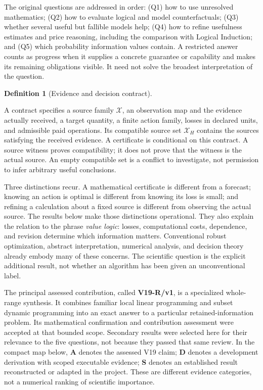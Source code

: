 \documentclass{article}
\theoremstyle{definition}
\newtheorem{definition}[theorem]{Definition}
\begin{document}
The original questions are addressed in order: (Q1) how to use
unresolved mathematics; (Q2) how to evaluate logical and model
counterfactuals; (Q3) whether several useful but fallible models help;
(Q4) how to refine usefulness estimates and price reasoning, including
the comparison with Logical Induction; and (Q5) which probability
information values contain. A restricted answer counts as progress when
it supplies a concrete guarantee or capability and makes its remaining
obligations visible. It need not solve the broadest interpretation of
the question.

\begin{definition}[Evidence and decision contract]\label{def-contract}

A contract specifies a source family \(\mathcal X\), an observation map
and the evidence actually received, a target quantity, a finite action
family, losses in declared units, and admissible paid operations. Its
compatible source set \(\mathcal X_H\) contains the sources satisfying
the received evidence. A certificate is conditional on this contract. A
source witness proves compatibility; it does not prove that the witness
is the actual source. An empty compatible set is a conflict to
investigate, not permission to infer arbitrary useful conclusions.

\end{definition}

Three distinctions recur. A mathematical certificate is different from a
forecast; knowing an action is optimal is different from knowing its
loss is small; and refining a calculation about a fixed source is
different from observing the actual source. The results below make those
distinctions operational. They also explain the relation to the phrase
\emph{value logic}: losses, computational costs, dependence, and
revision determine which information matters. Conventional robust
optimization, abstract interpretation, numerical analysis, and decision
theory already embody many of these concerns. The scientific question is
the explicit additional result, not whether an algorithm has been given
an unconventional label.

The principal assessed contribution, called \textbf{V19-R/v1}, is a
specialized whole-range synthesis. It combines familiar local linear
programming and subset dynamic programming into an exact answer to a
particular retained-information problem. Its mathematical confirmation
and contribution assessment were accepted at that bounded scope.
Secondary results were selected here for their relevance to the five
questions, not because they passed that same review. In the compact map
below, \textbf{A} denotes the assessed V19 claim; \textbf{D} denotes a
development derivation with scoped executable evidence; \textbf{S}
denotes an established result reconstructed or adapted in the project.
These are different evidence categories, not a numerical ranking of
scientific importance.
\end{document}
